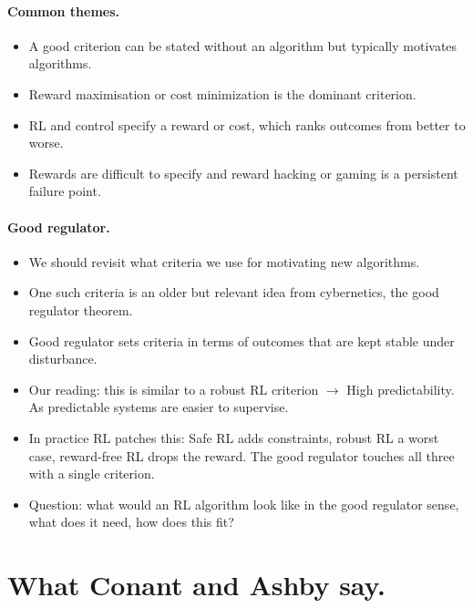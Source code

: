 \documentclass[10pt]{article}
\begin{document}
\paragraph{Common themes.}
\begin{itemize}
  \item A good criterion can be stated without an algorithm but typically motivates algorithms.
  \item Reward maximisation or cost minimization is the dominant criterion. 
  \item RL and control specify a reward or cost, which ranks outcomes from better to worse.
  \item Rewards are difficult to specify and reward hacking or gaming is a persistent failure point.
\end{itemize}

\paragraph{Good regulator.}
\begin{itemize}
  \item We should revisit what criteria we use for motivating new algorithms. 
  \item One such criteria is an older but relevant idea from cybernetics, the good regulator theorem.
  \item Good regulator sets criteria in terms of outcomes that are kept stable under disturbance.
  \item Our reading: this is similar to a robust RL criterion $\rightarrow$ High predictability. As predictable systems are easier to supervise.
  \item In practice RL patches this: Safe RL adds constraints, robust RL a worst case, reward-free RL drops the reward. The good regulator touches all three with a single criterion.
  \item Question: what would an RL algorithm look like in the good regulator sense, what does it need, how does this fit?
\end{itemize}

\section{What Conant and Ashby say.}
\end{document}

